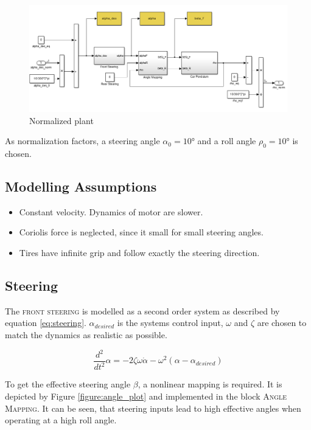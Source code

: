 \documentclass[conference]{IEEEtran}
\begin{document}
\begin{figure}[h]
\centering
  \includegraphics[width=.47\textwidth]{pics/P_car.png} 
  \caption{Normalized plant}  
  \label{figure:P_car}
\end{figure}

As normalization factors, a steering angle $\alpha_{0}=10°$ and a roll angle $\rho_{0}=10°$ is chosen.


\subsection{Modelling Assumptions}

\begin{itemize}
    \item Constant velocity. Dynamics of motor are slower.
    \item Coriolis force is neglected, since it small for small steering angles.
    \item Tires have infinite grip and follow exactly the steering direction.
\end{itemize}


\subsection{Steering}

The \textsc{front steering} is modelled as a second order system as described by equation \ref{eq:steering}. $\alpha _{desired}$ is the systems control input, $\omega$ and $\zeta$ are chosen to match the dynamics as realistic as possible.

\begin{equation}
\frac{{{d^2}}}{{d{t^2}}}\alpha  =  - 2\zeta \omega \dot \alpha  - {\omega ^2}\left( {\alpha  - {\alpha _{desired}}} \right)
\label{eq:steering}
\end{equation}

To get the effective steering angle $\beta$, a nonlinear mapping is required. It is depicted by Figure \ref{figure:angle_plot} and implemented in the block \textsc{Angle Mapping}. It can be seen, that steering inputs lead to high effective angles when operating at a high roll angle.

\end{document}
